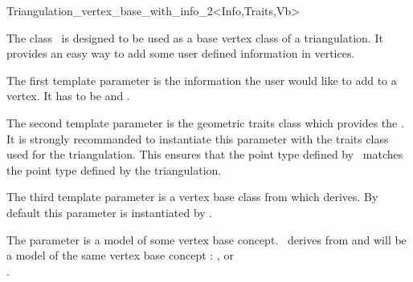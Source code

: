 

\begin{ccRefClass}{Triangulation_vertex_base_with_info_2<Info,Traits,Vb>}  %


\ccDefinition
  
The class \ccRefName\ is designed to be used as a base vertex class
of a triangulation. It provides an easy way to add some user defined information in vertices.


\ccParameters

The first template parameter is the information the user would like to add
to a vertex.  It has to be  and .

The second template parameter is the geometric traits class
which provides the . It is strongly 
recommanded to instantiate this parameter
with the traits class used for   the triangulation.
This ensures that the point type defined by \ccRefName\
matches  the point type defined by 
the triangulation.

The third template parameter is a vertex base class from which
 derives.  By default
this parameter is instantiated by
.

\ccIsModel
The parameter  is a model of some vertex base concept.
\ccRefName\ derives from \ccc{Vb} and will be a model of the
same vertex base concept :
, or \\
.

\ccTypes
{}




\end{ccRefClass}
